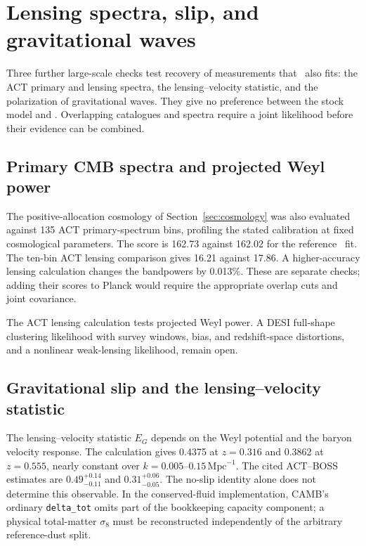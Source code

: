 \section{Lensing spectra, slip, and gravitational waves}
\label{sec:benchmarks}

Three further large-scale checks test recovery of measurements that
\LCDM\ also fits: the ACT primary and lensing spectra, the
lensing--velocity statistic, and the polarization of gravitational waves.
They give no preference between the stock model and \LCDM. Overlapping
catalogues and spectra require a joint likelihood before their evidence
can be combined. 

\subsection{Primary CMB spectra and projected Weyl power}
\label{sec:cmb}
The positive-allocation cosmology of Section~\ref{sec:cosmology} was
also evaluated against 135 ACT primary-spectrum bins, profiling the
stated calibration at fixed cosmological parameters. The score is
162.73 against 162.02 for the reference \LCDM\ fit. The ten-bin ACT
lensing comparison gives 16.21 against 17.86. A higher-accuracy
lensing calculation changes the bandpowers by 0.013\%. These are
separate checks; adding their scores to Planck would require the
appropriate overlap cuts and joint covariance. \cite{actnew}


The ACT lensing calculation tests projected Weyl power. A DESI full-shape
clustering likelihood with survey windows, bias, and redshift-space
distortions, and a nonlinear weak-lensing likelihood, remain open.

\subsection{Gravitational slip and the lensing--velocity statistic}
\label{sec:eg}
The lensing--velocity statistic $E_G$ depends on the Weyl potential and
the baryon velocity response. The calculation gives 0.4375 at
$z=0.316$ and 0.3862 at $z=0.555$, nearly constant over
$k=0.005$--$0.15\,\mathrm{Mpc}^{-1}$. The cited ACT--BOSS estimates
are $0.49^{+0.14}_{-0.11}$ and $0.31^{+0.06}_{-0.05}$.
The no-slip identity alone does not determine this observable.
In the conserved-fluid implementation, CAMB's ordinary
\texttt{delta\_tot} omits part of the bookkeeping capacity component;
a physical total-matter $\sigma_8$ must be reconstructed independently
of the arbitrary reference-dust split. \cite{egnew}


